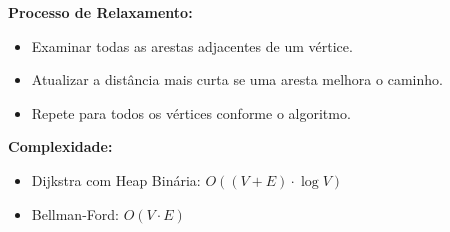 \documentclass[preview]{standalone}
\begin{document}
\begin{center}
\textbf{Processo de Relaxamento:}
            \begin{itemize}
                \item Examinar todas as arestas adjacentes de um vértice.
                \item Atualizar a distância mais curta se uma aresta melhora o caminho.
                \item Repete para todos os vértices conforme o algoritmo.
            \end{itemize}
            
            \textbf{Complexidade:}
            \begin{itemize}
                \item Dijkstra com Heap Binária: $O((V + E) \cdot \log V)$
                \item Bellman-Ford: $O(V \cdot E)$
            \end{itemize}
\end{center}
\end{document}
